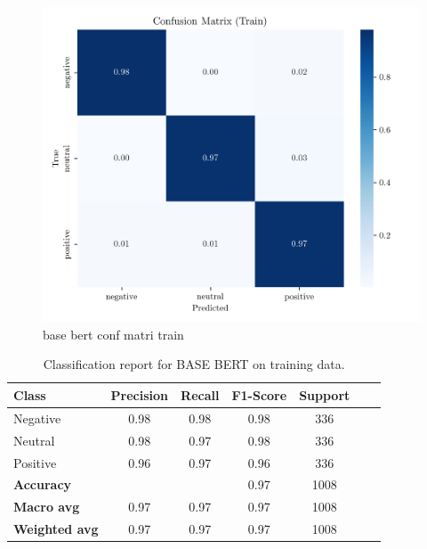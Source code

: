 \documentclass[conference]{IEEEtran}
\begin{document}
\begin{figure}[H]
    \centering
    \includegraphics[width=1\linewidth]{assets/base_bert_confusion_matrix_Train.png}
    \caption{base bert conf matri train}
    \label{fig:base_bert_confusion_matrix_Train}
\end{figure}

\begin{table}[H]
\centering
\caption{Classification report for BASE BERT on training data.}
\label{cr_basebert_train}
\begin{tabular}{lcccccc}
\toprule
\textbf{Class} & \textbf{Precision} & \textbf{Recall} & \textbf{F1-Score} & \textbf{Support} \\
\midrule
Negative & 0.98 & 0.98 & 0.98 & 336 \\
Neutral & 0.98 & 0.97 & 0.98 & 336 \\
Positive & 0.96 & 0.97 & 0.96 & 336 \\
\midrule
\textbf{Accuracy} &  &  & 0.97 & 1008 \\
\textbf{Macro avg} & 0.97 & 0.97 & 0.97 & 1008 \\
\textbf{Weighted avg} & 0.97 & 0.97 & 0.97 & 1008 \\
\bottomrule
\end{tabular}
\end{table}
\end{document}
